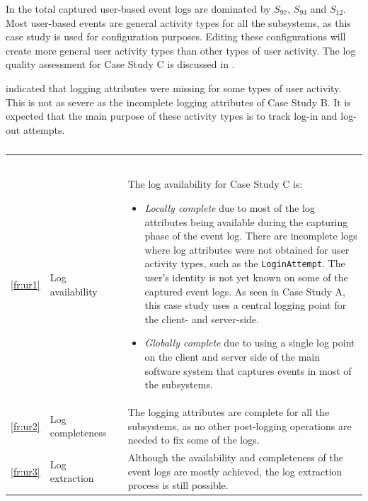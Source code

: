 In  the total captured user-based event logs are dominated by $S_{97}$, $S_{93}$ and $S_{12}$. Most user-based events are general activity types for all the subsystems, as this case study is used for configuration purposes. Editing these configurations will create more general user activity types than other types of user activity. The log quality assessment for Case Study C is discussed in . \par {} indicated that logging attributes were missing for some types of user activity. This is not as severe as the incomplete logging attributes of Case Study B. It is expected that the main purpose of these activity types is to track log-in and log-out attempts.

\begin{xltabular}{\textwidth}{clcX}
	\caption[Logging quality assessment of Case Study C]{\textit{Logging quality assessment of Case Study C}}\label{tbl:ch3_caseCQuality}\\
	\toprule
	 &  &  &  \\
	\midrule
	\endfirsthead

	\caption[]{\continueCaption} \\
	\toprule
	 &  &  &  \\
	\midrule
	\endhead

	\midrule
	 \\ 
	\endfoot
	\endlastfoot

	\ref{fr:ur1} & Log availability & \cmark & \RaggedRight The log availability for Case Study C is: \begin{itemize}
			\item \textit{Locally complete} due to most of the log attributes being available during the capturing phase of the event log. There are incomplete logs where log attributes were not obtained for user activity types, such as the \texttt{LoginAttempt}. The user's identity is not yet known on some of the captured event logs. As seen in Case Study A, this case study uses a central logging point for the client- and server-side.
			\item \textit{Globally complete} due to using a single log point on the client and server side of the main software system that captures events in most of the subsystems. 
		\end{itemize} \\
	\ref{fr:ur2} & Log completeness & \cmark & The logging attributes are complete for all the subsystems, as no other post-logging operations are needed to fix some of the logs. \\
	\ref{fr:ur3} & Log extraction & \cmark & Although the availability and completeness of the event logs are mostly achieved, the log extraction process is still possible. \\
	\bottomrule
\end{xltabular}

